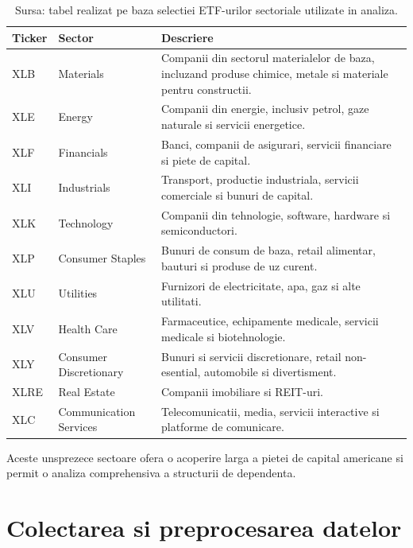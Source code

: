 \begin{table}[H]
\caption{ETF-urile sectoriale utilizate in analiza}
\label{tab:etfs}
\centering
\begin{tabularx}{\textwidth}{@{} l l >{\raggedright\arraybackslash}X @{}}
\toprule
Ticker & Sector & Descriere \\
\midrule
XLB  & Materials              & Companii din sectorul materialelor de baza, incluzand produse chimice, metale si materiale pentru constructii. \\
XLE  & Energy                 & Companii din energie, inclusiv petrol, gaze naturale si servicii energetice. \\
XLF  & Financials             & Banci, companii de asigurari, servicii financiare si piete de capital. \\
XLI  & Industrials            & Transport, productie industriala, servicii comerciale si bunuri de capital. \\
XLK  & Technology             & Companii din tehnologie, software, hardware si semiconductori. \\
XLP  & Consumer Staples       & Bunuri de consum de baza, retail alimentar, bauturi si produse de uz curent. \\
XLU  & Utilities              & Furnizori de electricitate, apa, gaz si alte utilitati. \\
XLV  & Health Care            & Farmaceutice, echipamente medicale, servicii medicale si biotehnologie. \\
XLY  & Consumer Discretionary & Bunuri si servicii discretionare, retail non-esential, automobile si divertisment. \\
XLRE & Real Estate            & Companii imobiliare si REIT-uri. \\
XLC  & Communication Services & Telecomunicatii, media, servicii interactive si platforme de comunicare. \\
\bottomrule
\end{tabularx}
\caption*{\footnotesize Sursa: tabel realizat pe baza selectiei ETF-urilor sectoriale utilizate in analiza.}
\end{table}


Aceste unsprezece sectoare ofera o acoperire larga a pietei de capital americane si
permit o analiza comprehensiva a structurii de dependenta.

\section{Colectarea si preprocesarea datelor}

